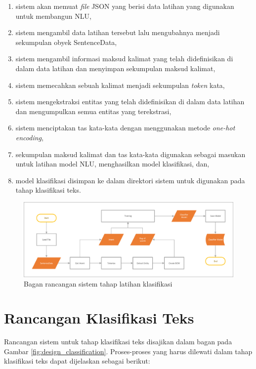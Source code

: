 \begin{enumerate}
	\item sistem akan memuat \textit{file} JSON yang berisi data latihan yang digunakan untuk membangun NLU,
	\item sistem mengambil data latihan tersebut lalu mengubahnya menjadi sekumpulan obyek SentenceData,
	\item sistem mengambil informasi maksud kalimat yang telah didefinisikan di dalam data latihan dan menyimpan sekumpulan maksud kalimat,
	\item sistem memecahkan sebuah kalimat menjadi sekumpulan \textit{token} kata,
	\item sistem mengekstraksi entitas yang telah didefinisikan di dalam data latihan dan mengumpulkan semua entitas yang terekstrasi,
	\item sistem menciptakan tas kata-kata dengan menggunakan metode \textit{one-hot encoding},
	\item sekumpulan maksud kalimat dan tas kata-kata digunakan sebagai masukan untuk latihan model NLU, menghasilkan model klasifikasi, dan,
	\item model klasifikasi disimpan ke dalam direktori sistem untuk digunakan pada tahap klasifikasi teks.
\end{enumerate}

\begin{figure}[H]
	\centering
	\includegraphics[width=\textwidth, trim=2 2 2 2, clip]{resources/3/design_training.pdf}
	\caption{Bagan rancangan sistem tahap latihan klasifikasi}
	\label{fig:design_training}
\end{figure}

\section{Rancangan Klasifikasi Teks}

Rancangan sistem untuk tahap klasifikasi teks disajikan dalam bagan pada Gambar \ref{fig:design_classification}. Proses-proses yang harus dilewati dalam tahap klasifikasi teks dapat dijelaskan sebagai berikut:

